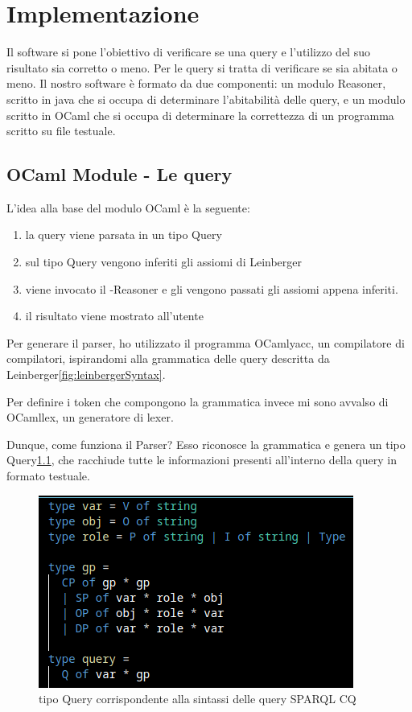 \chapter[Implementazione]{Implementazione}
\label{chap:Implementazione}
Il software si pone l'obiettivo di verificare se una query e l'utilizzo del suo risultato sia corretto o meno. Per le query si tratta di verificare se sia abitata o meno. Il nostro software è formato da due componenti: un modulo Reasoner, scritto in java che si occupa di determinare l'abitabilità delle query, e un modulo scritto in OCaml che si occupa di determinare la correttezza di un programma scritto su file testuale.

\section{OCaml Module - Le query}
\label{sec:OCaml Module - Le query}
L'idea alla base del modulo OCaml è la seguente:
\begin{enumerate}
    \item la query viene parsata in un tipo Query
    \item sul tipo Query vengono inferiti gli assiomi di Leinberger
    \item viene invocato il -Reasoner e gli vengono passati gli assiomi appena inferiti.
    \item il risultato viene mostrato all'utente
\end{enumerate}

Per generare il parser, ho utilizzato il programma OCamlyacc, un compilatore di compilatori, ispirandomi alla grammatica delle query descritta da Leinberger\ref{fig:leinbergerSyntax}. 

Per definire i token che compongono la grammatica invece mi sono avvalso di OCamllex, un generatore di lexer.


Dunque, come funziona il Parser? Esso riconosce la grammatica e genera un tipo Query\ref{fig:querType}, che racchiude tutte le informazioni presenti all'interno della query in formato testuale. 

\begin{figure}[H]
    \centering
    \includegraphics[scale=0.7]{pictures/queryType.png}
    \caption{tipo Query corrispondente alla sintassi delle query SPARQL CQ}
    \label{fig:querType}
\end{figure}


